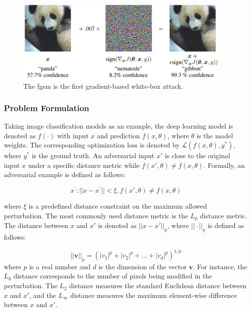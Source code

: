 \begin{figure}[H]
\centering
\includegraphics[width=0.95\textwidth]{figures/chapter_intro/fgsm.jpg}
\caption{The \acrfull{fgsm}\citep{goodfellow2015explaining} is the first gradient-based white-box attack.}
\label{fig.adv_perturb}
\end{figure}

\subsubsection{Problem Formulation}

Taking image classification models as an example, the deep learning model is denoted as $f(\cdot)$ with input $x$ and prediction $f(x, \theta)$, where $\theta$ is the model weights. The corresponding optimization loss is denoted by $\mathcal{L}(f(x, \theta), y^*)$, where $y^*$ is the ground truth. An adversarial input $x'$ is close to the original input $x$ under a specific distance metric while $f(x', \theta) \neq f(x, \theta)$. Formally, an adversarial example is defined as follows:

\begin{equation}
x^{'}: ||x - x^{'}|| < \xi, f(x', \theta) \neq f(x, \theta)
\end{equation}

where $ \xi$ is a predefined distance constraint on the maximum allowed perturbation. The most commonly used distance metric is the $L_p$ distance metric. The distance between $x$ and $x'$ is denoted as $||x-x'||_{p}$, where $||\cdot||_p$ is defined as follows:

\begin{equation}
 ||\textbf{v}||_p = (|v_1|^p + |v_2|^p + \dots + |v_d|^p)^{1/p}
\end{equation}
where $p$ is a real number and $d$ is the dimension of the vector $\textbf{v}$. For instance, the $L_0$ distance corresponds to the number of pixels being modified in the perturbation. The $L_2$ distance measures the standard Euclidean distance between $x$ and $x'$, and the $L_\infty$ distance measures the maximum element-wise difference between $x$ and $x'$.

